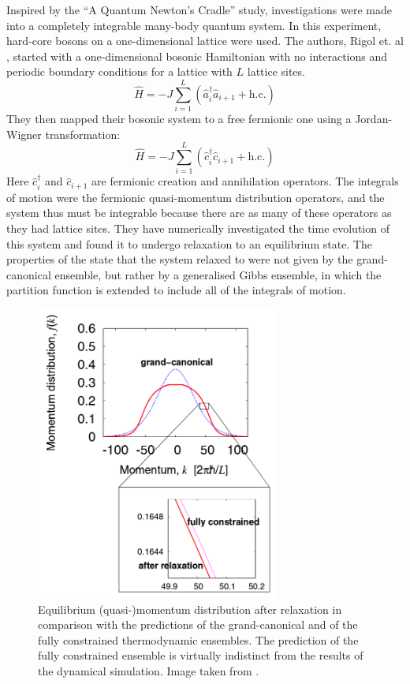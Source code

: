 \documentclass[a4paper, 10pt]{article}
\theoremstyle{plain}
\begin{document}
Inspired by the ``A Quantum Newton's Cradle'' study, investigations were made
into a completely integrable many-body quantum system. In this experiment,
hard-core bosons on a one-dimensional lattice were used. The authors, Rigol et.
al \cite{Rigol2007}, started with a one-dimensional bosonic Hamiltonian with no
interactions and periodic boundary conditions for a lattice with $L$ lattice
sites.
\begin{equation}
 \hat{H}=-J\sum_{i=1}^{L} (\hat{a}_{i}^{\dagger}\hat{a}_{i+1} + \text{h.c.})
\end{equation}
They then mapped their bosonic system to a free fermionic one using a
Jordan-Wigner transformation:
\begin{equation}
    \hat{H}
    =
    -J \sum_{i=1}^{L}{(\hat{c}_{i}^{\dagger}\hat{c}_{i+1} + \text{h.c.})}
\end{equation}
Here $\hat{c}_{i}^{\dagger}$ and $\hat{c}_{i+1}$ are fermionic creation and
annihilation operators. The integrals of motion were the fermionic
quasi-momentum distribution operators, and the system thus must be
integrable because there are as many of these operators as they had lattice
sites. They have numerically investigated the time evolution of this system and
found it to undergo relaxation to an equilibrium state. The properties of the
state that the system relaxed to were not given by the grand-canonical
ensemble, but rather by a generalised Gibbs ensemble, in which the partition
function is extended to include all of the integrals of motion.
\begin{figure}[H]
    \begin{center}
        \includegraphics[width=8cm]{grand_canonical_vs_GGE}
    \end{center}
    \caption{Equilibrium (quasi-)momentum distribution after relaxation in
             comparison with the predictions of the grand-canonical and of the
             fully constrained thermodynamic ensembles. The prediction of the
             fully constrained  ensemble is virtually indistinct from the
             results of the dynamical simulation. Image taken from
             \cite{Rigol2007}.}
\end{figure}
\end{document}
